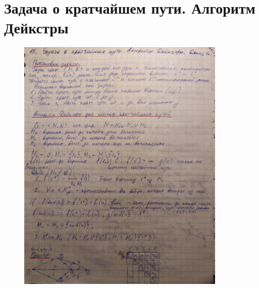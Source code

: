 \documentclass[discrete.tex]{subfiles}
\begin{document}
  \section{Задача о кратчайшем пути. Алгоритм Дейкстры}

  \begin{task}

  \end{task}

  \begin{aalg}[с.224]

  \end{aalg}

  \begin{alg}[Дейкстры]

  \end{alg}

  \begin{figure}[H]
          \includegraphics[width=10cm]{pics/45_1}
          \centering
  \end{figure}
\end{document}
